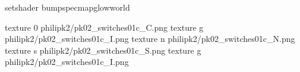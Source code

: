 setshader bumpspecmapglowworld


texture 0 philipk2/pk02_switches01c_C.png
texture g philipk2/pk02_switches01c_I.png
texture n philipk2/pk02_switches01c_N.png
texture s philipk2/pk02_switches01c_S.png
texture g philipk2/pk02_switches01c_I.png

